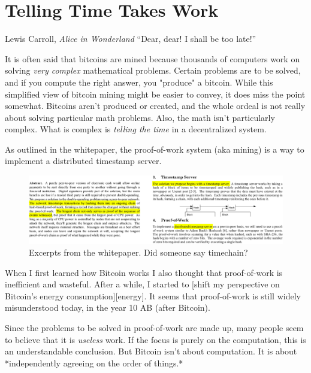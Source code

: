 \chapter{Telling Time Takes Work}
\label{les:17}

\begin{chapquote}{Lewis Carroll, \textit{Alice in Wonderland}}
``Dear, dear! I shall be too late!''
\end{chapquote}

It is often said that bitcoins are mined because thousands of computers
work on solving \textit{very complex} mathematical problems. Certain problems
are to be solved, and if you compute the right answer, you "produce" a
bitcoin. While this simplified view of bitcoin mining might be easier to
convey, it does miss the point somewhat. Bitcoins aren't produced or
created, and the whole ordeal is not really about solving particular
math problems. Also, the math isn't particularly complex. What is
complex is \textit{telling the time} in a decentralized system.

As outlined in the whitepaper, the proof-of-work system (aka mining) is
a way to implement a distributed timestamp server.

\begin{figure}
  \includegraphics{assets/images/bitcoin-whitepaper-timestamp-wide.png}
  \caption{Excerpts from the whitepaper. Did someone say timechain?}
  \label{fig:bitcoin-whitepaper-timestamp-wide}
\end{figure}

When I first learned how Bitcoin works I also thought that proof-of-work
is inefficient and wasteful. After a while, I started to [shift my
perspective on Bitcoin's energy consumption][energy]. It seems that
proof-of-work is still widely misunderstood today, in the year 10 AB
(after Bitcoin).

Since the problems to be solved in proof-of-work are made up, many
people seem to believe that it is \textit{useless} work. If the focus is purely
on the computation, this is an understandable conclusion. But Bitcoin
isn't about computation. It is about *independently agreeing on the
order of things.*

